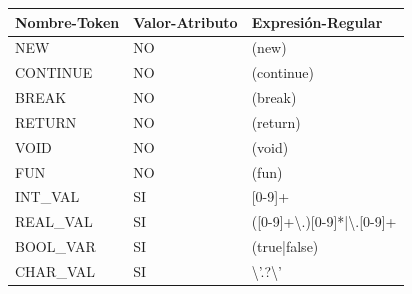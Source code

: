 \documentclass[11pt, english]{article}
\begin{document}
\begin{table}[H]
	\begin{tabular}{l|l|l}
		\toprule
		\textbf{Nombre-Token} & \textbf{Valor-Atributo} & \textbf{Expresión-Regular}\\
		\midrule
		NEW                                                      & NO                                                                   & (new)                                                               \\
		CONTINUE                                                 & NO                                                                   & (continue)                                                          \\
		BREAK                                                    & NO                                                                   & (break)                                                             \\
		RETURN                                                   & NO                                                                   & (return)                                                            \\
		VOID                                                     & NO                                                                   & (void)                                                              \\
		FUN                                                      & NO                                                                   & (fun)                                                               \\
		INT\_VAL                                                 & SI                                                                   & {[}0-9{]}+                                                          \\
		REAL\_VAL                                                & SI                                                                   & ({[}0-9{]}+\textbackslash{}.){[}0-9{]}*|\textbackslash{}.{[}0-9{]}+ \\
		BOOL\_VAR                                                & SI                                                                   & (true|false)                                                        \\
		CHAR\_VAL                                                & SI                                                                   & \textbackslash{}'.?\textbackslash{}'                                \\

\end{tabular}
\end{table}
\end{document}
